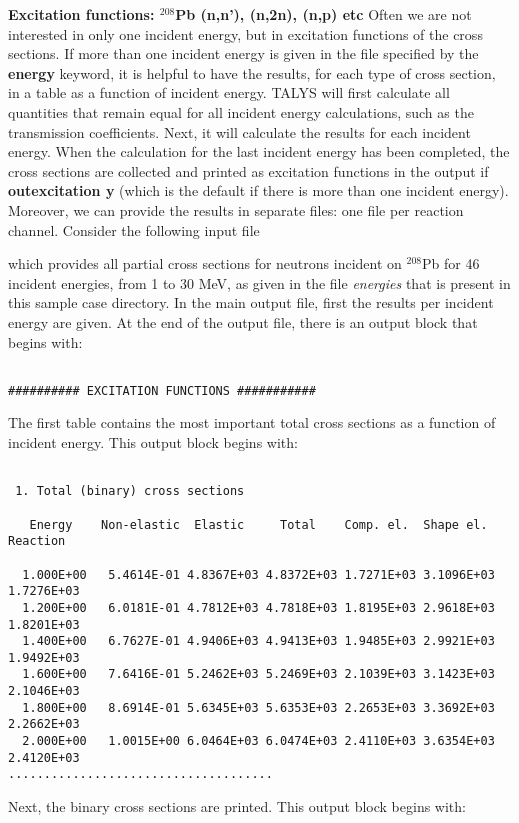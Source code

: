 \begin{samplecase}
{\bf Excitation functions: ${}^{208}$Pb (n,n'), (n,2n), (n,p) etc}\newline
Often we are not interested in only one incident energy, but in excitation 
functions of the cross sections.
If more than one incident energy is given in the file specified by the 
{\bf energy} keyword, it is helpful to have the results, for each type of cross 
section, in a table as a function of incident energy. TALYS will first 
calculate 
all quantities that remain equal for all incident energy calculations, such as 
the transmission coefficients. Next, it will calculate the results for each 
incident energy. When the calculation for 
the last incident energy has been completed, the cross sections are 
collected 
and printed as excitation functions in the output if {\bf outexcitation y} 
(which is the default if there is more than one incident energy).
Moreover, we can provide
the results in separate files: one file per reaction channel.
Consider the following input file
 

which provides all partial cross sections for neutrons incident on ${}^{208}$Pb
for 46 incident energies, from 1 to 30 MeV, as given in the file 
{\em energies} that is present in this sample case directory.
In the main output file, first the results per incident energy are given.
At the end of the output file, there is an output block that begins with:  

{\small \begin{verbatim}

########## EXCITATION FUNCTIONS ###########
\end{verbatim} } \renewcommand{\baselinestretch}{1.07}\small\normalsize
\noindent
The first table contains the most important total cross sections as a function 
of incident energy. This output block begins with:

{\small \begin{verbatim}

 1. Total (binary) cross sections
 
   Energy    Non-elastic  Elastic     Total    Comp. el.  Shape el.  Reaction   
 
  1.000E+00   5.4614E-01 4.8367E+03 4.8372E+03 1.7271E+03 3.1096E+03 1.7276E+03 
  1.200E+00   6.0181E-01 4.7812E+03 4.7818E+03 1.8195E+03 2.9618E+03 1.8201E+03 
  1.400E+00   6.7627E-01 4.9406E+03 4.9413E+03 1.9485E+03 2.9921E+03 1.9492E+03 
  1.600E+00   7.6416E-01 5.2462E+03 5.2469E+03 2.1039E+03 3.1423E+03 2.1046E+03 
  1.800E+00   8.6914E-01 5.6345E+03 5.6353E+03 2.2653E+03 3.3692E+03 2.2662E+03
  2.000E+00   1.0015E+00 6.0464E+03 6.0474E+03 2.4110E+03 3.6354E+03 2.4120E+03
.....................................
\end{verbatim} } \renewcommand{\baselinestretch}{1.07}\small\normalsize
\noindent
Next, the binary cross sections are printed.
This output block begins with:


\end{samplecase}
